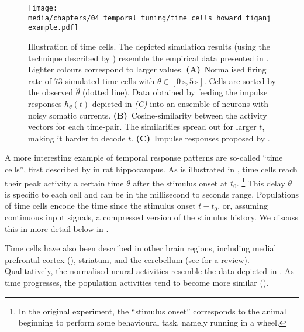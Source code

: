\begin{figure}
	\centering
	\texttt{[image: media/chapters/04\_temporal\_tuning/time\_cells\_howard\_tiganj\_example.pdf]}%
	{\label{fig:time_cells_howard_tiganj_example_a}}%
	{\label{fig:time_cells_howard_tiganj_example_b}}%
	{\label{fig:time_cells_howard_tiganj_example_c}}%
	\caption[Illustration of time cells]{
		Illustration of time cells.
		The depicted simulation results (using the technique described by \cite{howard2014unified}) resemble the empirical data presented in \citet{tiganj2016sequential}.
		Lighter colours correspond to larger values.
		\textbf{(A)}~Normalised firing rate of $73$ simulated time cells with $\theta \in [\SI{0}{\second}, \SI{5}{\second}]$. Cells are sorted by the observed $\hat \theta$ (dotted line).
		Data obtained by feeding the impulse responses $h_\theta(t)$ depicted in \emph{(C)} into an ensemble of \LIF neurons with noisy somatic currents.
		\textbf{(B)}~Cosine-similarity between the activity vectors for each time-pair. The similarities spread out for larger $t$, making it harder to decode $t$.
		\textbf{(C)}~Impulse responses proposed by \citet{howard2014unified}.
	}
	\label{fig:time_cells_howard_tiganj_example}
\end{figure}

A more interesting example of temporal response patterns are so-called \enquote{time cells}, first described by \citet{pastalkova2008internally} in rat hippocampus.
As is illustrated in , time cells reach their peak activity a certain time $\theta$ after the stimulus onset at $t_0$.%
\footnote{In the original \citet{pastalkova2008internally} experiment, the \enquote{stimulus onset} corresponds to the animal beginning to perform some behavioural task, namely running in a wheel.}
This delay $\theta$ is specific to each cell and can be in the millisecond to seconds range.
Populations of time cells encode the time since the stimulus onset $t - t_0$, or, assuming continuous input signals, a compressed version of the stimulus history.
We discuss this in more detail below in .

Time cells have also been described in other brain regions, including medial prefrontal cortex (\cite{tiganj2016sequential}), striatum, and the cerebellum (see \cite{lusk2016cerebellar} for a review).
Qualitatively, the normalised neural activities resemble the data depicted in .
As time progresses, the population activities tend to become more similar ().

